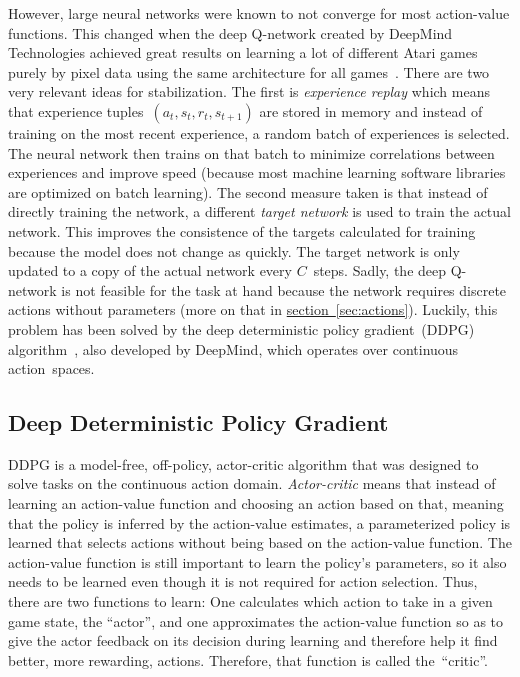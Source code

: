 \documentclass[a4paper,titlepage]{article}
\begin{document}
However, large neural networks were known to not converge for most action-value functions. This changed when the deep Q-network created by DeepMind Technologies achieved great results on learning a lot of different Atari games purely by pixel data using the same architecture for all games~\cite{nature}. There are two very relevant ideas for stabilization. The first is \emph{experience replay} which means that experience tuples~$(a_t, s_t, r_t, s_{t+1})$ are stored in memory and instead of training on the most recent experience, a random batch of experiences is selected. The neural network then trains on that batch to minimize correlations between experiences and improve speed (because most machine learning software libraries are optimized on batch learning). The second measure taken is that instead of directly training the network, a different \emph{target network} is used to train the actual network. This improves the consistence of the targets calculated for training because the model does not change as quickly. The target network is only updated to a copy of the actual network every $C$~steps. Sadly, the deep Q-network is not feasible for the task at hand because the network requires discrete actions without parameters (more on that in \hyperref[sec:actions]{section~\ref*{sec:actions}}). Luckily, this problem has been solved by the deep deterministic policy gradient~(DDPG) algorithm~\cite{ddpg}, also developed by DeepMind, which operates over continuous action~spaces.

\subsection{Deep Deterministic Policy Gradient}
\label{sec:ddpg}

DDPG is a model-free, off-policy, actor-critic algorithm that was designed to solve tasks on the continuous action domain. \emph{Actor-critic} means that instead of learning an action-value function and choosing an action based on that, meaning that the policy is inferred by the action-value estimates, a parameterized policy is learned that selects actions without being based on the action-value function. The action-value function is still important to learn the policy's parameters, so it also needs to be learned even though it is not required for action selection. Thus, there are two functions to learn: One calculates which action to take in a given game state, the ``actor'', and one approximates the action-value function so as to give the actor feedback on its decision during learning and therefore help it find better, more rewarding, actions. Therefore, that function is called the~``critic''.
\end{document}

